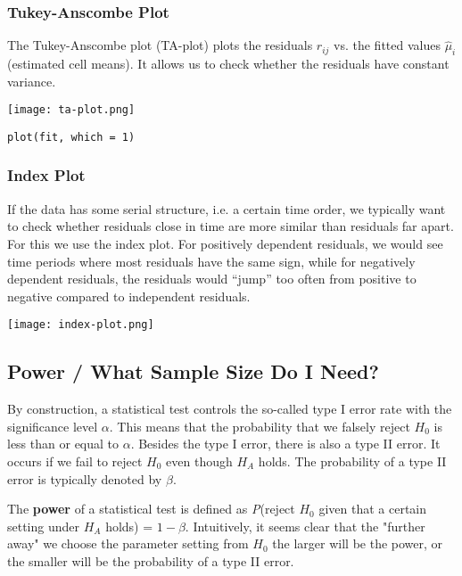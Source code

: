 \subsubsection{Tukey-Anscombe Plot}

The Tukey-Anscombe plot (TA-plot) plots the residuals $r_{ij}$ vs. the fitted values $\hat \mu_i$ (estimated cell means). It allows us to check whether the residuals have constant variance.
\begin{center}
	\texttt{[image: ta-plot.png]}
\end{center}
\begin{lstlisting}
plot(fit, which = 1)
\end{lstlisting}

\subsubsection{Index Plot}

If the data has some serial structure, i.e. a certain time order, we typically want to check whether residuals close in time are more similar than residuals far apart. For this we use the index plot. For positively dependent residuals, we would see time periods where most residuals have the same sign, while for negatively dependent residuals, the residuals would “jump” too often from positive to negative compared to independent residuals. 
\begin{center}
	\texttt{[image: index-plot.png]}
\end{center}


\subsection{Power / What Sample Size Do I Need?}

By construction, a statistical test controls the so-called type I error rate with the significance level $\alpha$. This means that the probability that we falsely reject $H_0$ is less than or equal to $\alpha$. Besides the type I error, there is also a type II error. It occurs if we fail to reject $H_0$ even though $H_A$ holds. The probability of a type II error is typically denoted by $\beta$. \medskip

The \textbf{power} of a statistical test is defined as \textit{P}(reject $H_0$ given that a certain setting under $H_A$ holds) = $1 - \beta$. Intuitively, it seems clear that the "further away" we choose the parameter setting from $H_0$ the larger will be the power, or the smaller will be the probability of a type II error.

